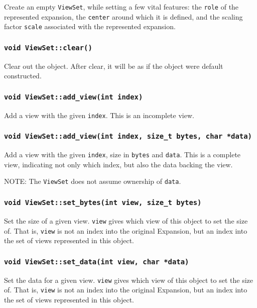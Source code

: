 Create an empty \texttt{ViewSet}, while setting a few vital features: the
\texttt{role} of the represented expansion, the \texttt{center} around which it
is defined, and the scaling factor \texttt{scale} associated with the
represented expansion. 

\subsubsection{\texttt{void ViewSet::clear()}}

Clear out the object. After clear, it will be as if the object were default
constructed.

\subsubsection{\texttt{void ViewSet::add\_view(int index)}}

Add a view with the given \texttt{index}. This is an incomplete view.

\subsubsection{\texttt{void ViewSet::add\_view(int index, size\_t bytes, char *data)}}

Add a view with the given \texttt{index}, size in \texttt{bytes} and
\texttt{data}. This is a complete view, indicating not only which index, but
also the data backing the view.

NOTE: The \texttt{ViewSet} does not assume ownership of \texttt{data}.

\subsubsection{\texttt{void ViewSet::set\_bytes(int view, size\_t bytes)}}

Set the size of a given view. \texttt{view} gives which view of this object to
set the size of. That is, \texttt{view} is not an index into the original
Expansion, but an index into the set of views represented in this object.

\subsubsection{\texttt{void ViewSet::set\_data(int view, char *data)}}

Set the data for a given view. \texttt{view} gives which view of this object to
set the size of. That is, \texttt{view} is not an index into the original
Expansion, but an index into the set of views represented in this object.

